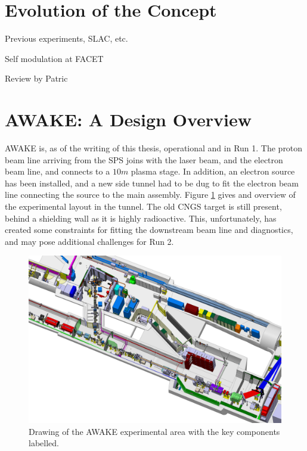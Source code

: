 \section{Evolution of the Concept}
\label{WFA:History}

Previous experiments, SLAC, etc.

\cite{rosenzweig:1988, blumenfeld:2007, kallos:2008, litos:2014}

Self modulation at FACET \cite{adli:2016}

Review by Patric \cite{muggli:2009}

\section{AWAKE: A Design Overview}
\label{WFA:Design}

AWAKE is, as of the writing of this thesis, operational and in Run 1. The proton beam line arriving from the SPS joins with the laser beam, and the electron beam line, and connects to a $10\unit{m}$ plasma stage. In addition, an electron source has been installed, and a new side tunnel had to be dug to fit the electron beam line connecting the source to the main assembly. Figure \ref{Fig:WFA:AWAKE} gives and overview of the experimental layout in the tunnel. The old CNGS target is still present, behind a shielding wall as it is highly radioactive. This, unfortunately, has created some constraints for fitting the downstream beam line and diagnostics, and may pose additional challenges for Run 2.

\begin{figure}[hbt]
    \centering
    \includegraphics[width=0.99\linewidth,trim={0mm 0mm 0mm 0mm},clip]{figures/AwakeExperiment}
    \caption{\label{Fig:WFA:AWAKE} Drawing of the AWAKE experimental area with the key components labelled.}
\end{figure}

